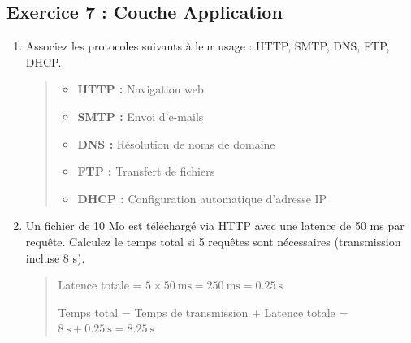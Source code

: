 \documentclass[a4paper,12pt]{article}
\begin{document}
\subsection*{Exercice 7 : Couche Application}
\begin{enumerate}
    \item Associez les protocoles suivants à leur usage : HTTP, SMTP, DNS, FTP, DHCP.
    \begin{quote}
        \begin{itemize}
            \item \textbf{HTTP :} Navigation web
            \item \textbf{SMTP :} Envoi d'e-mails
            \item \textbf{DNS :} Résolution de noms de domaine
            \item \textbf{FTP :} Transfert de fichiers
            \item \textbf{DHCP :} Configuration automatique d'adresse IP
        \end{itemize}
    \end{quote}
    \item Un fichier de 10 Mo est téléchargé via HTTP avec une latence de 50 ms par requête. Calculez le temps total si 5 requêtes sont nécessaires (transmission incluse 8 s).
    \begin{quote}
        Latence totale = $5 \times 50~\text{ms} = 250~\text{ms} = 0.25~\text{s}$
        
        Temps total = Temps de transmission + Latence totale = $8~\text{s} + 0.25~\text{s} = 8.25~\text{s}$
    \end{quote}
\end{enumerate}
\end{document}
